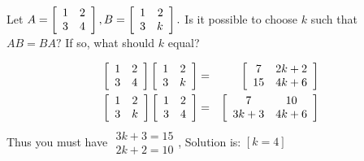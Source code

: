 \begin{enumialphparenastyle}
\begin{ex} Let $A=\left[
\begin{array}{rr}
1 & 2 \\
3 & 4
\end{array}
\right] ,B=\left[
\begin{array}{rr}
1 & 2 \\
3 & k
\end{array}
\right] .$ Is it possible to choose $k$ such that $AB=BA?$ If so, what
should $k$ equal? 
\begin{sol}
\begin{eqnarray*}
\left[
\begin{array}{cc}
1 & 2 \\
3 & 4
\end{array}
\right] \left[
\begin{array}{cc}
1 & 2 \\
3 & k
\end{array}
\right] &=& \left[
\begin{array}{cc}
7 & 2k+2 \\
15 & 4k+6
\end{array}
\right] \\
 \left[
\begin{array}{cc}
1 & 2 \\
3 & k
\end{array}
\right] \left[
\begin{array}{cc}
1 & 2 \\
3 & 4
\end{array}
\right] &=& \left[
\begin{array}{cc}
7 & 10 \\
3k+3 & 4k+6
\end{array}
\right]
\end{eqnarray*}
 Thus you must have $
\begin{array}{c}
3k+3=15 \\
2k+2=10
\end{array}
$, Solution is: $\left[ k=4\right] $
\end{sol}
\end{ex}


\end{enumialphparenastyle}
